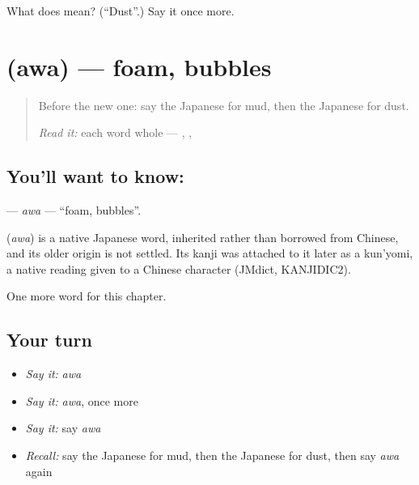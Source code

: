 \begin{tcolorbox}[breakable,colback=teal!4,colframe=teal!35!black,title={Before you move on}]
What does  mean? (\textquotedblleft{}Dust\textquotedblright{}.) Say it once more.
\end{tcolorbox}
\section[\texorpdfstring{\ja{あわ} (awa)}{あわ (awa)}]{ (awa) — foam, bubbles}

\label{lesson:JA-C107-awa}



\begin{quote}
Before the new one: say the Japanese for mud, then the Japanese for dust.

\emph{Read it:} each word whole — \textbf{}, \textbf{}, \textbf{}
\end{quote}

\subsection*{You'll want to know: }
\textbf{} — \emph{awa} — \textquotedblleft{}foam, bubbles\textquotedblright{}.

\begin{cousinweb}
\textbf{} (\emph{awa}) is a native Japanese word, inherited rather than borrowed from Chinese, and its older origin is not settled. Its kanji was attached to it later as a kun'yomi, a native reading given to a Chinese character (JMdict, KANJIDIC2).
\end{cousinweb}

\begin{grammarlens}[title={What you've built}]
One more word for this chapter.
\end{grammarlens}

\subsection*{Your turn}
\begin{itemize}
\raggedright
  \item \emph{Say it:} \emph{awa}
  \item \emph{Say it:} \emph{awa}, once more
  \item \emph{Say it:} say \emph{awa}
  \item \emph{Recall:} say the Japanese for mud, then the Japanese for dust, then say \emph{awa} again
\end{itemize}

